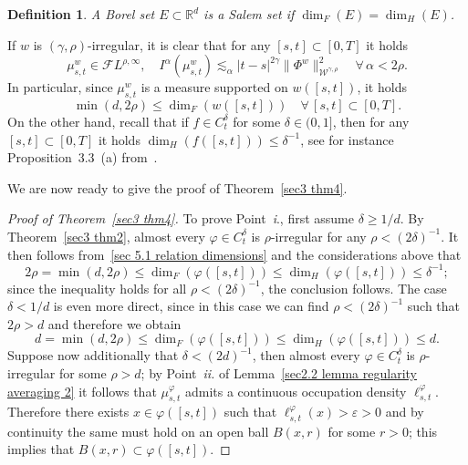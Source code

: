 \documentclass[10pt]{article}
\newcommand{\comma}{{,}}
\newcommand{\tmtextit}[1]{{\itshape{#1}}}
\newtheorem{definition}[theorem]{Definition}
\begin{document}
\begin{definition}
  A Borel set $E \subset \mathbb{R}^d$ is a Salem set if $\dim_F (E) = \dim_H
  (E)$.
\end{definition}

If $w$ is $(\gamma, \rho)$\mbox{-}irregular, it is clear that for any $[s, t]
\subset [0, T]$ it holds
\[ \mu^w_{s, t} \in \mathcal{F} L^{\rho, \infty}, \quad I^{\alpha} (\mu^w_{s,
   t}) \lesssim_{\alpha} | t - s |^{2 \gamma} \| \Phi^w
   \|^2_{\mathcal{W}^{\gamma \comma \rho}} \quad \forall \, \alpha < 2 \rho .
\]
In particular, since $\mu^w_{s, t}$ is a measure supported on $w ([s, t])$, it
holds
\[ \min (d, 2 \rho) \leqslant \dim_F (w ([s, t])) \quad \forall \, [s, t]
   \subset [0, T] . \]
On the other hand, recall that if $f \in C^{\delta}_t$ for some $\delta\in (0,1]$, then for any $[s, t]
\subset [0, T]$ it holds $\dim_H (f ([s, t])) \leqslant \delta^{- 1}$, see for
instance Proposition~3.3~(a) from~{\cite{falconer}}.

We are now ready to give the proof of Theorem~\ref{sec3 thm4}.

\begin{proof}[Proof of Theorem~\ref{sec3 thm4}]
  To prove Point~\tmtextit{i}., first assume $\delta \geqslant 1 / d$. By
  Theorem~\ref{sec3 thm2}, almost every $\varphi \in C^{\delta}_t$ is
  $\rho$-irregular for any $\rho < (2 \delta)^{- 1}$. It then follows
  from~\eqref{sec 5.1 relation dimensions} and the considerations above that
  \[ 2 \rho = \min (d, 2 \rho) \leqslant \dim_F (\varphi ([s, t])) \leqslant
     \dim_H (\varphi ([s, t])) \leqslant \delta^{- 1} ; \]
  since the inequality holds for all $\rho < (2 \delta)^{- 1}$, the conclusion
  follows. The case $\delta < 1 / d$ is even more direct, since in this case
  we can find $\rho < (2 \delta)^{- 1}$ such that $2 \rho > d$ and therefore
  we obtain
  \[ d = \min (d, 2 \rho) \leqslant \dim_F (\varphi ([s, t])) \leqslant \dim_H
     (\varphi ([s, t])) \leqslant d. \]
  Suppose now additionally that $\delta < (2 d)^{- 1}$, then almost every
  $\varphi \in C^{\delta}_t$ is $\rho$\mbox{-}irregular for some $\rho > d$;
  by Point~\tmtextit{ii.} of Lemma~\ref{sec2.2 lemma regularity averaging 2}
  it follows that $\mu^{\varphi}_{s, t}$ admits a continuous occupation
  density $\ell^{\varphi}_{s, t}$. Therefore there exists $x \in \varphi ([s,
  t])$ such that $\ell^{\varphi}_{s, t} (x) > \varepsilon > 0$ and by
  continuity the same must hold on an open ball $B (x, r)$ for some $r > 0$;
  this implies that $B (x, r) \subset \varphi ([s, t])$.
\end{proof}
\end{document}
